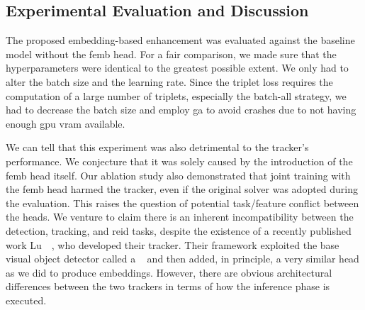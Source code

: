 \subsection{Experimental Evaluation and Discussion}

The proposed embedding-based enhancement was evaluated against the baseline model without the \gls{femb} head. For a fair comparison, we made sure that the hyperparameters were identical to the greatest possible extent. We only had to alter the batch size and the learning rate. Since the triplet loss requires the computation of a large number of triplets, especially the batch-all strategy, we had to decrease the batch size and employ \gls{ga} to avoid crashes due to not having enough \gls{gpu} \gls{vram} available.

We can tell that this experiment was also detrimental to the tracker's performance. We conjecture that it was solely caused by the introduction of the \gls{femb} head itself. Our ablation study also demonstrated that joint training with the \gls{femb} head harmed the tracker, even if the original solver was adopted during the evaluation. This raises the question of potential task/feature conflict between the heads. We venture to claim there is an inherent incompatibility between the detection, tracking, and \gls{reid} tasks, despite the existence of a recently published work Lu~\etal{}~\cite{lu2020retinatrack}, who developed their \retinatrack{} tracker. Their framework exploited the base visual object detector called a \retinanet{}~\cite{lin2018focal} and then added, in principle, a very similar head as we did to produce embeddings. However, there are obvious architectural differences between the two trackers in terms of how the inference phase is executed.

